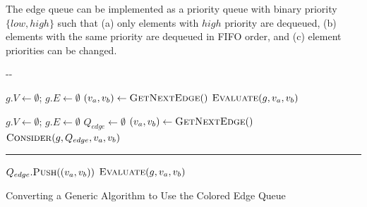 \documentclass{report}
\newlength{\offsetpage}
\newenvironment{widepage}
   {\begin{adjustwidth}{-\offsetpage}{-\offsetpage}%
    \addtolength{\textwidth}{2\offsetpage}}%
{\end{adjustwidth}}
\begin{document}
The edge queue can be implemented as a priority queue with
binary priority $\{ low, high \}$
such that
(a) only elements with $high$ priority are dequeued,
(b) elements with the same priority are dequeued in FIFO order,
and (c) element priorities can be changed.

\begin{algorithm}[t]
\begin{widepage}

\begin{minipage}{.43\textwidth}
\begin{algorithmic}[1]
\State $g.V \leftarrow \emptyset$; $g.E \leftarrow \emptyset$
\State
\Loop
\State $(v_a,v_b) \leftarrow \mbox{\textsc{GetNextEdge}}()$
\State $\mbox{\textsc{Evaluate}}(g, v_a, v_b)$%
\EndLoop
\EndProcedure
\end{algorithmic}
\end{minipage}
\;
\begin{minipage}{.55\textwidth}
\begin{algorithmic}[1]
\State $g.V \leftarrow \emptyset$; $g.E \leftarrow \emptyset$
\State $Q_{edge} \leftarrow \emptyset$
\Loop
\State $(v_a,v_b) \leftarrow \mbox{\textsc{GetNextEdge}}()$
\State $\mbox{\textsc{Consider}}(g, Q_{edge}, v_a, v_b)$
\EndLoop
\EndProcedure
\end{algorithmic}
\end{minipage}

\vspace{0.05in}
\rule{\textwidth}{.1pt}%

\begin{algorithmic}[1]
\State $Q_{edge}.\mbox{\textsc{Push}}((v_a, v_b))$
   \label{line:color-check}%
\State $\mbox{\textsc{Evaluate}}(g, v_a, v_b)$%
\EndWhile
\EndProcedure
\end{algorithmic}

\caption{Converting a Generic Algorithm to Use the Colored Edge Queue}
\label{alg:generic-comparison}
\end{widepage}
\end{algorithm}
\end{document}
